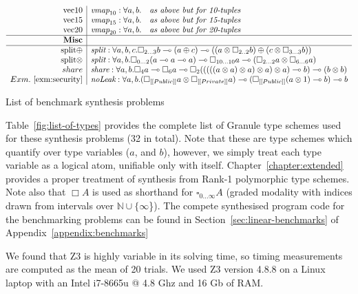 \begin{table}
{{\begin{align*}
\begin{array}{r|rll}
\text{vec10} & \textit{vmap}_{10} : \forall a, b . & \textit{as above but for 10-tuples} \\
\text{vec15} & \textit{vmap}_{15} : \forall a, b . & \textit{as above but for 15-tuples} \\
\text{vec20} & \textit{vmap}_{20} : \forall a, b . & \textit{as above but for 20-tuples}\\ \hline
\textbf{Misc} \\ \hline
\text{split$\oplus$} & \multicolumn{2}{l}{ \textit{split} : \forall a, b, c .
\Box_{2...3} b \multimap (a \oplus c) \multimap (( a \otimes \Box_{2..2} b) \oplus (c \otimes \Box_{3...3} b))}
 \\
\text{split$\otimes$} & \multicolumn{2}{l}{\textit{split} : \forall a, b . 
\Box_{0...2} (a \multimap a \multimap a) \multimap \Box_{10...10} a \multimap (\Box_{2...2} a \otimes \Box_{6...6} a) 
}
\\
share & \multicolumn{2}{l}{\textit{share} : \forall a, b .  \Box_4 a \multimap \Box_6 a \multimap \Box_2 ((((( a \otimes a) \otimes a) \otimes a) \otimes a) \multimap b) \multimap (b \otimes b)}
\\
Exm.~\ref{exm:security}
& \multicolumn{2}{l}{\textit{noLeak} : \forall a, b . (\Box_{[[ Public ]]} a \otimes \Box_{[[ Private]]} a) \multimap (\Box_{[[ Public ]]}(a \otimes 1) \multimap b) \multimap b }
\end{array}
\end{align*}
}}
\caption{List of benchmark synthesis problems}
\label{fig:list-of-types}
\end{table}
%
Table~\ref{fig:list-of-types} provides the complete list of Granule type schemes
used for these synthesis problems (32 in total). Note that these are type
schemes which quantify over type variables ($a$, and $b$), however, we simply
treat each type variable as a logical atom, unifiable only with itself.
Chapter~\ref{chapter:extended} provides a proper treatment of synthesis from
Rank-1 polymorphic type schemes. Note also that $\Box A$ is used as shorthand
for $\square_{0...\infty} A$ (graded modality with indices drawn from intervals
over $\mathbb{N} \cup \{\infty$\}). The compete synthesised program code for the
benchmarking problems can be found in Section~\ref{sec:linear-benchmarks} of
Appendix~\ref{appendix:benchmarks}


We found that Z3 is highly variable in its solving time, so timing
measurements are computed as the mean of 20 trials. We used
Z3 version 4.8.8 on a Linux laptop with an Intel i7-8665u @ 4.8 Ghz
and 16 Gb of RAM.


